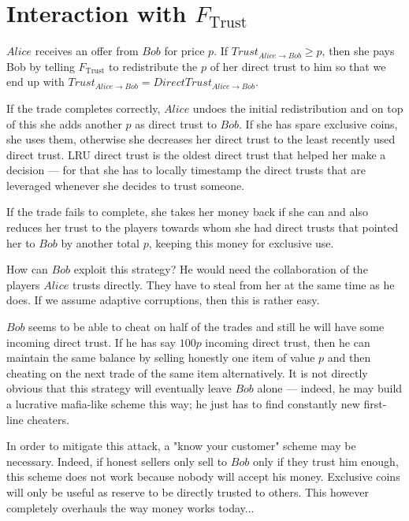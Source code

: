 \section{Interaction with $F_{\mathrm{Trust}}$}
$Alice$ receives an offer from $Bob$ for price $p$. If $Trust_{Alice \rightarrow Bob} \geq
p$, then she pays Bob by telling $F_{\mathrm{Trust}}$ to redistribute the $p$ of her
direct trust to him so that we end up with $Trust_{Alice \rightarrow Bob} =
DirectTrust_{Alice \rightarrow Bob}$.

If the trade completes correctly, $Alice$ undoes the initial redistribution and on top of
this she adds another $p$ as direct trust to $Bob$. If she has spare exclusive coins, she
uses them, otherwise she decreases her direct trust to the least recently used direct
trust. LRU direct trust is the oldest direct trust that helped her make a decision --- for
that she has to locally timestamp the direct trusts that are leveraged whenever she
decides to trust someone.

If the trade fails to complete, she takes her money back if she can and also reduces her
trust to the players towards whom she had direct trusts that pointed her to $Bob$ by
another total $p$, keeping this money for exclusive use.

How can $Bob$ exploit this strategy? He would need the collaboration of the players
$Alice$ trusts directly. They have to steal from her at the same time as he does. If we
assume adaptive corruptions, then this is rather easy.

$Bob$ seems to be able to cheat on half of the trades and still he will have some incoming
direct trust. If he has say $100p$ incoming direct trust, then he can maintain the same
balance by selling honestly one item of value $p$ and then cheating on the next trade of
the same item alternatively. It is not directly obvious that this strategy will eventually
leave $Bob$ alone --- indeed, he may build a lucrative mafia-like scheme this way; he just
has to find constantly new first-line cheaters.

In order to mitigate this attack, a "know your customer" scheme may be necessary.  Indeed,
if honest sellers only sell to $Bob$ only if they trust him enough, this scheme does not
work because nobody will accept his money. Exclusive coins will only be useful as reserve
to be directly trusted to others. This however completely overhauls the way money works
today...
